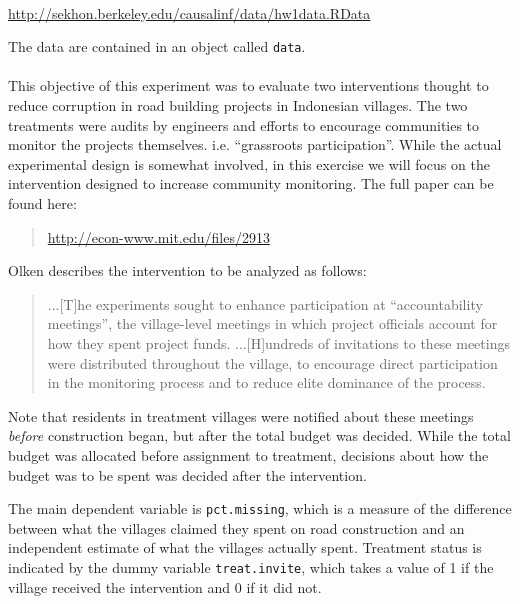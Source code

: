 \documentclass{article}
\begin{document}
\paragraph{}
\url{http://sekhon.berkeley.edu/causalinf/data/hw1data.RData}

The data are contained in an object called \texttt{data}.
\paragraph{}
This objective of this experiment was to evaluate two interventions
thought to reduce corruption in road building projects in Indonesian
villages. The two treatments were audits by engineers and efforts to
encourage communities to monitor the projects
themselves. i.e. ``grassroots participation''.  While the actual
experimental design is somewhat involved, in this exercise we will
focus on the intervention designed to increase community
monitoring. The full paper can be found here:
\begin{quote}
  \url{http://econ-www.mit.edu/files/2913}
\end{quote}


Olken describes the intervention to be analyzed as follows:
\begin{quote}
  ...[T]he experiments sought to enhance participation at
  ``accountability meetings'', the village-level meetings in which
  project officials account for how they spent project
  funds. ...[H]undreds of invitations to these meetings were
  distributed throughout the village, to encourage direct
  participation in the monitoring process and to reduce elite
  dominance of the process. 
\end{quote}
Note that residents in treatment villages were notified about these meetings
\textit{before} construction began, but after the total budget
was decided. While the total budget was allocated before assignment to treatment, decisions about how the budget was to be spent was decided after the intervention. 

The main dependent variable is \texttt{pct.missing}, which is a
measure of the difference between what the villages claimed they spent
on road construction and an independent estimate of what the villages
actually spent. Treatment status is indicated by the dummy variable
\texttt{treat.invite}, which takes a value of 1 if the village
received the intervention and 0 if it did not. 
\end{document}
